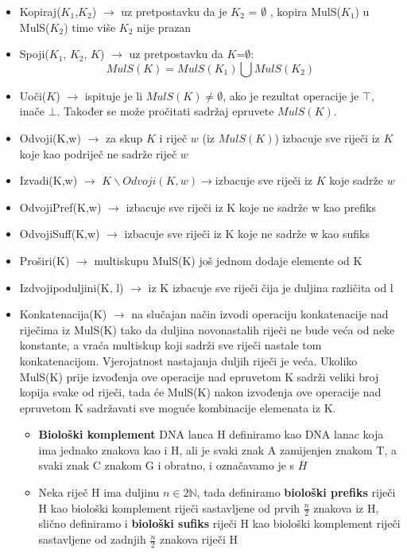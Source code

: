 \documentclass[a4paper,oneside,12pt]{memoir} %
\begin{document}
\begin{spacing}{1.5}
\begin{defn}
    \begin{itemize}
        \item Kopiraj($K_1$,$K_2$) $\to$ uz pretpostavku da je $K_2$ = $\emptyset$ , kopira MulS($K_1$) u MulS($K_2$) time više $K_2$ nije prazan
        \item Spoji($K_1$, $K_2$, $K$) $\to$ uz pretpostavku da $K$=$\emptyset$: \[MulS(K)=MulS(K_1)\bigcup MulS(K_2) \]
        \item Uoči($K$) $\to$ ispituje je li $MulS(K)\neq\emptyset$, ako je rezultat operacije je $\top$, inače $\bot$. Također se može pročitati sadržaj epruvete $MulS(K)$.
        \item Odvoji(K,w) $\to$ za skup $K$ i riječ $w$ (iz $MulS(K)$) izbacuje sve riječi iz $K$ koje kao podriječ ne sadrže riječ $w$
        \item Izvadi(K,w) $\to$ $K\backslash Odvoji(K,w)\to $izbacuje sve riječi iz $K$ koje sadrže $w$
        \item Odvoji\textunderscore Pref(K,w) $\to$ izbacuje sve riječi iz K koje ne sadrže w kao prefiks
        \item Odvoji\textunderscore Suff(K,w) $\to$ izbacuje sve riječi iz K koje ne sadrže w kao sufiks
        \item Proširi(K) $\to$ multiskupu MulS(K) još jednom dodaje elemente od K
        \item Izdvoji\textunderscore po\textunderscore duljini(K, l) $\to$ iz K izbacuje sve riječi čija je duljina različita od l
        \item Konkatenacija(K) $\to$ na slučajan način izvodi operaciju konkatenacije nad riječima iz MulS(K) tako da duljina novonastalih riječi ne bude veća od neke konstante, a vraća multiskup koji sadrži sve riječi nastale tom konkatenacijom. Vjerojatnost nastajanja duljih riječi je veća. Ukoliko MulS(K) prije izvođenja ove operacije nad epruvetom K sadrži veliki broj kopija svake od riječi, tada će MulS(K) nakon izvođenja ove operacije nad epruvetom K sadržavati sve moguće kombinacije elemenata iz K.
            \begin{itemize}
                \item \textbf{Biološki komplement} DNA lanca H definiramo kao DNA lanac koja ima jednako znakova kao i H, ali je svaki znak A zamijenjen znakom T, a svaki znak C znakom G i obratno, i označavamo je s $\overline{H}$
                \item Neka riječ H ima duljinu $n \in 2\mathbb{N}$, tada definiramo \textbf{biološki prefiks} riječi H kao biološki komplement riječi sastavljene od prvih $\frac{n}{2}$ znakova iz H, slično definiramo i \textbf{biološki sufiks} riječi H kao biološki komplement riječi sastavljene od zadnjih $\frac{n}{2}$ znakova riječi H

\end{itemize}
\end{itemize}
\end{defn}
\end{spacing}
\end{document}
